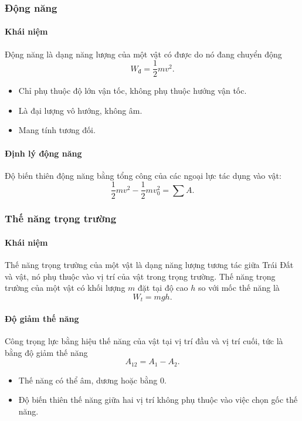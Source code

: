 \begin{tomtat}
\subsubsection{Động năng}
\paragraph{Khái niệm}
\begin{dn}
	Động năng là dạng năng lượng của một vật có được do nó đang chuyển động 
	$$W_{\text{đ}}=\dfrac{1}{2}mv^2.$$
\end{dn}
\begin{note}
	\begin{itemize}
		\item Chỉ phụ thuộc độ lớn vận tốc, không phụ thuộc hướng vận tốc.
		\item Là đại lượng vô hướng, không âm.
		\item Mang tính tương đối.
	\end{itemize}
\end{note}

\paragraph{Định lý động năng}
\begin{hq}
	Độ biến thiên động năng bằng tổng công của các ngoại lực tác dụng vào vật:
	$$\dfrac{1}{2}mv^2-\dfrac{1}{2}mv^2_0=\sum A .$$
\end{hq}
\subsubsection{Thế năng trọng trường}
\paragraph{Khái niệm}
\begin{dn}
	Thế năng trọng trường của một vật là dạng năng lượng tương tác giữa Trái Đất và vật, nó phụ thuộc vào vị trí của vật trong trọng trường. Thế năng trọng trường của một vật có khối lượng $m$ đặt tại độ cao $h$ so với mốc thế năng là
	$$W_t=mgh.$$
\end{dn}
\paragraph{Độ giảm thế năng}
Công trọng lực bằng hiệu thế năng của vật tại vị trí đầu và vị trí cuối, tức là bằng độ giảm thế năng
$$A_{12}=A_1-A_2.$$
\begin{note}
	\begin{itemize}
		\item Thế năng có thể âm, dương hoặc bằng 0.
		\item Độ biến thiên thế năng giữa hai vị trí không phụ thuộc vào việc chọn gốc thế năng.
	\end{itemize}
\end{note}

\end{tomtat}
